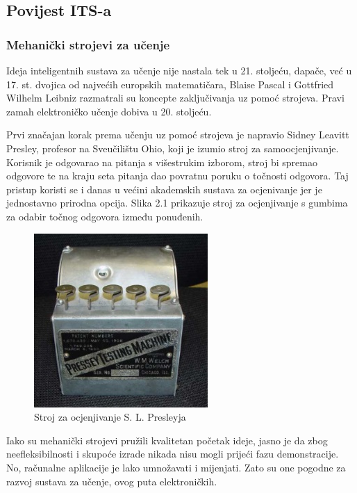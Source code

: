 \documentclass[times, utf8, zavrsni, numeric]{fer}
\begin{document}
\subsection{Povijest ITS-a}

\subsubsection{Mehanički strojevi za učenje}
Ideja inteligentnih sustava za učenje nije nastala tek u 21. stoljeću, dapače, već u 17. st. dvojica od najvećih europskih matematičara, Blaise Pascal i Gottfried Wilhelm Leibniz razmatrali su koncepte zaključivanja uz pomoć strojeva.\cite{leibniz}\cite{pascal} Pravi zamah elektroničko učenje dobiva u 20. stoljeću.
\par
Prvi značajan korak prema učenju uz pomoć strojeva je napravio Sidney Leavitt Presley, profesor na Sveučilištu Ohio, koji je izumio stroj za samoocjenjivanje.\cite{pressey} Korisnik je odgovarao na pitanja s višestrukim izborom, stroj bi spremao odgovore te na kraju seta pitanja dao povratnu poruku o točnosti odgovora. Taj pristup koristi se i danas u većini akademskih sustava za ocjenivanje jer je jednostavno prirodna opcija. Slika 2.1 prikazuje stroj za ocjenjivanje s gumbima za odabir točnog odgovora između ponuđenih.

\begin{figure}[htb]
	\centering
	\includegraphics[]{img/pressey.jpg}
	\caption{Stroj za ocjenjivanje S. L. Presleyja\cite{presseymachinepic}}
	\label{fig:pressey}
\end{figure}

Iako su mehanički strojevi pružili kvalitetan početak ideje, jasno je da zbog neefleksibilnosti i skupoće izrade nikada nisu mogli prijeći fazu demonstracije. No, računalne aplikacije je lako umnožavati i mijenjati. Zato su one pogodne za razvoj sustava za učenje, ovog puta elektroničkih.
\end{document}
